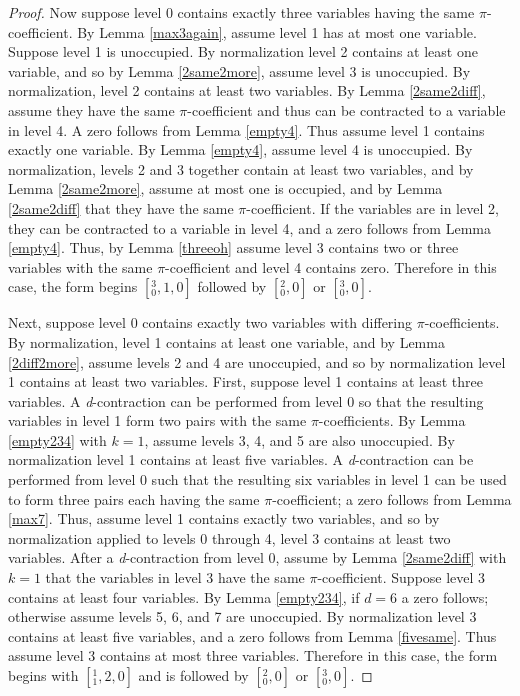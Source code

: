 \documentclass[12pt]{amsart}
\begin{document}
\begin{proof}
Now suppose level 0 contains exactly three variables having the same $\pi$-coefficient.  By Lemma \ref{max3again}, assume level 1 has at most one variable.  Suppose level 1 is unoccupied.  By normalization level 2 contains at least one variable, and so by Lemma \ref{2same2more}, assume level 3 is unoccupied.  By normalization, level 2 contains at least two variables.  By Lemma \ref{2same2diff}, assume they have the same $\pi$-coefficient and thus can be contracted to a variable in level 4.  A zero follows from Lemma \ref{empty4}.  Thus assume level 1 contains exactly one variable.  By Lemma \ref{empty4}, assume level 4 is unoccupied.  By normalization, levels 2 and 3 together contain at least two variables, and by Lemma \ref{2same2more}, assume at most one is occupied, and by Lemma \ref{2same2diff} that they have the same $\pi$-coefficient.  If the variables are in level 2, they can be contracted to a variable in level 4, and a zero follows from Lemma \ref{empty4}.  Thus, by Lemma \ref{threeoh} assume level 3 contains two or three variables with the same $\pi$-coefficient and level 4 contains zero.  Therefore in this case, the form begins $[{}^3_0, 1, 0]$ followed by $[{}^2_0,0]$ or $[{}^3_0,0]$.

Next, suppose level 0 contains exactly two variables with differing $\pi$-coefficients.  By normalization, level 1 contains at least one variable, and by Lemma \ref{2diff2more}, assume levels 2 and 4 are unoccupied, and so by normalization level 1 contains at least two variables.  First, suppose level 1 contains at least three variables.  A \textit{d}-contraction can be performed from level 0 so that the resulting variables in level 1 form two pairs with the same $\pi$-coefficients.  By Lemma \ref{empty234} with $k=1$, assume levels 3, 4, and 5 are also unoccupied.  By normalization level 1 contains at least five variables.  A \textit{d}-contraction can be performed from level 0 such that the resulting six variables in level 1 can be used to form three pairs each having the same $\pi$-coefficient; a zero follows from Lemma \ref{max7}.  Thus, assume level 1 contains exactly two variables, and so by normalization applied to levels 0 through 4, level 3 contains at least two variables.  After a \textit{d}-contraction from level 0, assume by Lemma \ref{2same2diff} with $k=1$ that the variables in level 3 have the same $\pi$-coefficient.  Suppose level 3 contains at least four variables.  By Lemma \ref{empty234}, if $d=6$ a zero follows; otherwise assume levels 5, 6, and 7 are unoccupied.  By normalization level 3 contains at least five variables, and a zero follows from Lemma \ref{fivesame}.  Thus assume level 3 contains at most three variables.  Therefore in this case, the form begins with $[{}^1_1, 2, 0]$ and is followed by $[{}^2_0, 0]$ or $[{}^3_0, 0]$.


\end{proof}
\end{document}
